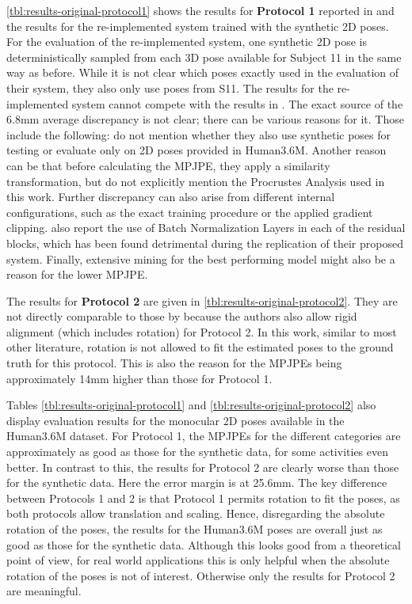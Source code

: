 \autoref{tbl:results-original-protocol1} shows the results for \textbf{Protocol 1} reported in \cite{drover18} and the results for the re-implemented system trained with the synthetic 2D poses.
For the evaluation of the re-implemented system, one synthetic 2D pose is deterministically sampled from each 3D pose available for Subject 11 in the same way as before.
While it is not clear which poses \citet{drover18} exactly used in the evaluation of their system, they also only use poses from S11.
The results for the re-implemented system cannot compete with the results in \cite{drover18}.
The exact source of the 6.8mm average discrepancy is not clear; there can be various reasons for it.
Those include the following:
\citet{drover18} do not mention whether they also use synthetic poses for testing or evaluate only on 2D poses provided in Human3.6M.
Another reason can be that before calculating the MPJPE, they apply a similarity transformation, but do not explicitly mention the Procrustes Analysis used in this work.
Further discrepancy can also arise from different internal configurations, such as the exact training procedure or the applied gradient clipping.
\citet{drover18} also report the use of Batch Normalization Layers in each of the residual blocks, which has been found detrimental during the replication of their proposed system.
Finally, extensive mining for the best performing model might also be a reason for the lower MPJPE.

The results for \textbf{Protocol 2} are given in \autoref{tbl:results-original-protocol2}.
They are not directly comparable to those by \citet{drover18} because the authors also allow rigid alignment (which includes rotation) for Protocol 2.
In this work, similar to most other literature, rotation is not allowed to fit the estimated poses to the ground truth for this protocol.
This is also the reason for the MPJPEs being approximately 14mm higher than those for Protocol 1.

Tables \ref{tbl:results-original-protocol1} and \ref{tbl:results-original-protocol2} also display evaluation results for the monocular 2D poses available in the Human3.6M dataset.
For Protocol 1, the MPJPEs for the different categories are approximately as good as those for the synthetic data, for some activities even better.
In contrast to this, the results for Protocol 2 are clearly worse than those for the synthetic data.
Here the error margin is at 25.6mm.
The key difference between Protocols 1 and 2 is that Protocol 1 permits rotation to fit the poses, as both protocols allow translation and scaling.
Hence, disregarding the absolute rotation of the poses, the results for the Human3.6M poses are overall just as good as those for the synthetic data.
Although this looks good from a theoretical point of view, for real world applications this is only helpful when the absolute rotation of the poses is not of interest.
Otherwise only the results for Protocol 2 are meaningful.

